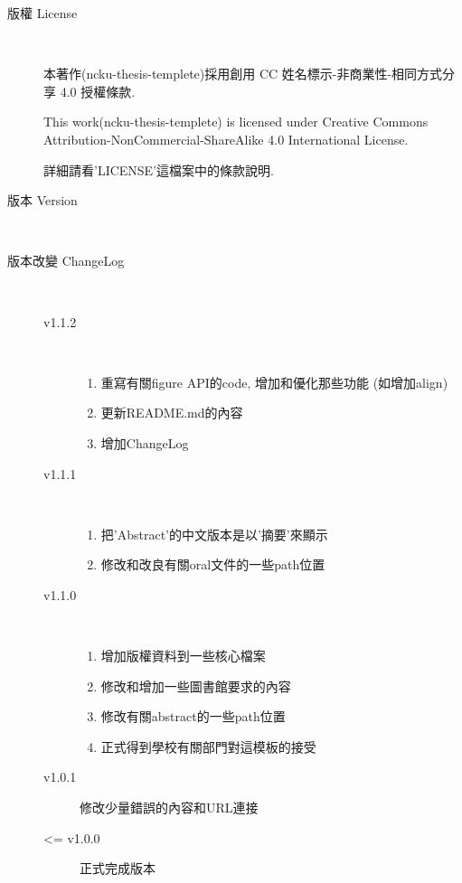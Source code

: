 \begin{description}
  \item[版權 License] \hfill \\

    本著作(ncku-thesis-templete)採用創用 CC 姓名標示-非商業性-相同方式分享 4.0 授權條款.

    This work(ncku-thesis-templete) is licensed under Creative Commons Attribution-NonCommercial-ShareAlike 4.0 International License.

  詳細請看'LICENSE'這檔案中的條款說明.

  \item[版本 Version] \hfill \\
    \ThisThesisVersion

  \item[版本改變 ChangeLog] \hfill \\
    \begin{description}
      \item[v1.1.2] \hfill \\
        \begin{enumerate}
          \item 重寫有關figure API的code, 增加和優化那些功能 (如增加align)
          \item 更新README.md的內容
          \item 增加ChangeLog
        \end{enumerate}

      \item[v1.1.1] \hfill \\
        \begin{enumerate}
          \item 把'Abstract'的中文版本是以'摘要'來顯示
          \item 修改和改良有關oral文件的一些path位置
        \end{enumerate}

      \item[v1.1.0] \hfill \\
        \begin{enumerate}
          \item 增加版權資料到一些核心檔案
          \item 修改和增加一些圖書館要求的內容
          \item 修改有關abstract的一些path位置
          \item 正式得到學校有關部門對這模板的接受
        \end{enumerate}

      \item[v1.0.1] 修改少量錯誤的內容和URL連接

      \item[<= v1.0.0] 正式完成版本
    \end{description}
\end{description}

\EndChapter
